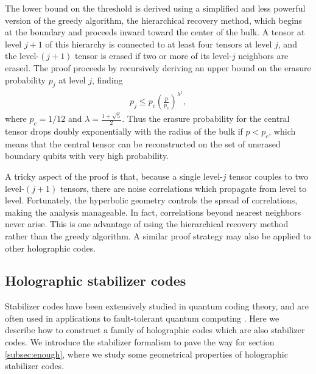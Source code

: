 \documentclass[12pt]{article}
\theoremstyle{plain}
\theoremstyle{plain}
\theoremstyle{plain}
\theoremstyle{plain}
\theoremstyle{result}
\theoremstyle{remark}
\theoremstyle{conjecture}
\theoremstyle{observation}
\theoremstyle{definition}
\theoremstyle{corollary}
\theoremstyle{definition}
\theoremstyle{definition}
\theoremstyle{assumption}
\theoremstyle{definition}
\theoremstyle{problem}
\theoremstyle{fact}
\begin{document}
The lower bound on the threshold is derived using a simplified and less powerful version of the greedy algorithm, the hierarchical recovery method, which begins at the boundary and proceeds inward toward the center of the bulk. 
A tensor at level $j+1$ of this hierarchy is connected to at least four tensors at level $j$, and the level-$(j+1)$ tensor is erased if two or more of its level-$j$ neighbors are erased. 
The proof proceeds by recursively deriving an upper bound on the erasure probability $p_j$ at level $j$, finding
\begin{align}
p_j \leq p_c \left(\frac{p}{p_c}\right)^{\lambda^j},
\end{align}
where $p_c= 1/12$ and $\lambda = \frac{1+\sqrt{5}}{2}$. 
Thus the erasure probability for the central tensor drops doubly exponentially with the radius of the bulk if $p< p_c$, which means that the central tensor can be reconstructed on the set of unerased boundary qubits with very high probability.

A tricky aspect of the proof is that, because a single level-$j$ tensor couples to two level-$(j+1)$ tensors, there are noise correlations which propagate from level to level. Fortunately, the hyperbolic geometry controls the spread of correlations, making the analysis manageable. In fact, correlations beyond nearest neighbors never arise. This is one advantage of using the hierarchical recovery method rather than the greedy algorithm. A similar proof strategy may also be applied to other holographic codes. 

\subsection{Holographic stabilizer codes}\label{subsec:stabilizer}

Stabilizer codes have been extensively studied in quantum coding theory, and are often used in applications to fault-tolerant quantum computing \cite{Gottesman2009}. Here we describe how to construct a family of holographic codes which are also stabilizer codes. We introduce the stabilizer formalism to pave the way for section \ref{subsec:enough}, where we study some geometrical properties of holographic stabilizer codes. 
\end{document}
